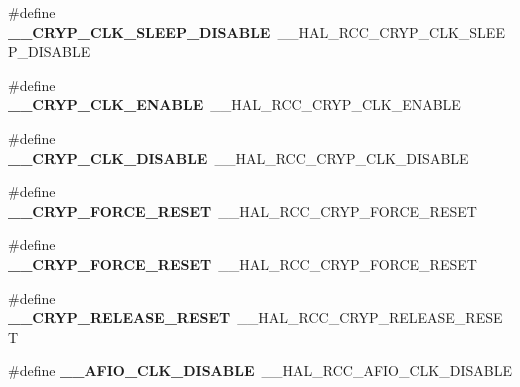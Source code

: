 \begin{DoxyCompactItemize}
\item 
\#define {\bfseries \+\_\+\+\_\+\+C\+R\+Y\+P\+\_\+\+C\+L\+K\+\_\+\+S\+L\+E\+E\+P\+\_\+\+D\+I\+S\+A\+B\+LE}~\+\_\+\+\_\+\+H\+A\+L\+\_\+\+R\+C\+C\+\_\+\+C\+R\+Y\+P\+\_\+\+C\+L\+K\+\_\+\+S\+L\+E\+E\+P\+\_\+\+D\+I\+S\+A\+B\+LE\hypertarget{group___h_a_l___r_c_c___aliased_gac488d20c2d3434a03757a62b47688854}{}\label{group___h_a_l___r_c_c___aliased_gac488d20c2d3434a03757a62b47688854}

\item 
\#define {\bfseries \+\_\+\+\_\+\+C\+R\+Y\+P\+\_\+\+C\+L\+K\+\_\+\+E\+N\+A\+B\+LE}~\+\_\+\+\_\+\+H\+A\+L\+\_\+\+R\+C\+C\+\_\+\+C\+R\+Y\+P\+\_\+\+C\+L\+K\+\_\+\+E\+N\+A\+B\+LE\hypertarget{group___h_a_l___r_c_c___aliased_ga044bf8666afaa469662c187c65807fd9}{}\label{group___h_a_l___r_c_c___aliased_ga044bf8666afaa469662c187c65807fd9}

\item 
\#define {\bfseries \+\_\+\+\_\+\+C\+R\+Y\+P\+\_\+\+C\+L\+K\+\_\+\+D\+I\+S\+A\+B\+LE}~\+\_\+\+\_\+\+H\+A\+L\+\_\+\+R\+C\+C\+\_\+\+C\+R\+Y\+P\+\_\+\+C\+L\+K\+\_\+\+D\+I\+S\+A\+B\+LE\hypertarget{group___h_a_l___r_c_c___aliased_gaab68329f44bc446bbfa67aa7328f28d5}{}\label{group___h_a_l___r_c_c___aliased_gaab68329f44bc446bbfa67aa7328f28d5}

\item 
\#define {\bfseries \+\_\+\+\_\+\+C\+R\+Y\+P\+\_\+\+F\+O\+R\+C\+E\+\_\+\+R\+E\+S\+ET}~\+\_\+\+\_\+\+H\+A\+L\+\_\+\+R\+C\+C\+\_\+\+C\+R\+Y\+P\+\_\+\+F\+O\+R\+C\+E\+\_\+\+R\+E\+S\+ET\hypertarget{group___h_a_l___r_c_c___aliased_ga01c73ed1328524317b1a87b0c65a8b8a}{}\label{group___h_a_l___r_c_c___aliased_ga01c73ed1328524317b1a87b0c65a8b8a}

\item 
\#define {\bfseries \+\_\+\+\_\+\+C\+R\+Y\+P\+\_\+\+F\+O\+R\+C\+E\+\_\+\+R\+E\+S\+ET}~\+\_\+\+\_\+\+H\+A\+L\+\_\+\+R\+C\+C\+\_\+\+C\+R\+Y\+P\+\_\+\+F\+O\+R\+C\+E\+\_\+\+R\+E\+S\+ET\hypertarget{group___h_a_l___r_c_c___aliased_ga01c73ed1328524317b1a87b0c65a8b8a}{}\label{group___h_a_l___r_c_c___aliased_ga01c73ed1328524317b1a87b0c65a8b8a}

\item 
\#define {\bfseries \+\_\+\+\_\+\+C\+R\+Y\+P\+\_\+\+R\+E\+L\+E\+A\+S\+E\+\_\+\+R\+E\+S\+ET}~\+\_\+\+\_\+\+H\+A\+L\+\_\+\+R\+C\+C\+\_\+\+C\+R\+Y\+P\+\_\+\+R\+E\+L\+E\+A\+S\+E\+\_\+\+R\+E\+S\+ET\hypertarget{group___h_a_l___r_c_c___aliased_ga0bfbfb4f9ecc493c450fb949d53c304d}{}\label{group___h_a_l___r_c_c___aliased_ga0bfbfb4f9ecc493c450fb949d53c304d}

\item 
\#define {\bfseries \+\_\+\+\_\+\+A\+F\+I\+O\+\_\+\+C\+L\+K\+\_\+\+D\+I\+S\+A\+B\+LE}~\+\_\+\+\_\+\+H\+A\+L\+\_\+\+R\+C\+C\+\_\+\+A\+F\+I\+O\+\_\+\+C\+L\+K\+\_\+\+D\+I\+S\+A\+B\+LE\hypertarget{group___h_a_l___r_c_c___aliased_ga35e6ac63d013180c4eb9505f3d2b6bc0}{}\label{group___h_a_l___r_c_c___aliased_ga35e6ac63d013180c4eb9505f3d2b6bc0}


\end{DoxyCompactItemize}

